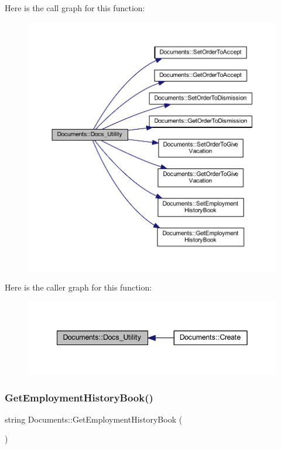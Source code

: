 Here is the call graph for this function\+:
\nopagebreak
\begin{figure}[H]
\begin{center}
\leavevmode
\includegraphics[width=350pt]{class_documents_a7f06bda36f9fe48a22a8c511aa1e2d06_cgraph}
\end{center}
\end{figure}
Here is the caller graph for this function\+:
\nopagebreak
\begin{figure}[H]
\begin{center}
\leavevmode
\includegraphics[width=342pt]{class_documents_a7f06bda36f9fe48a22a8c511aa1e2d06_icgraph}
\end{center}
\end{figure}
\mbox{\label{class_documents_a44b0e6798731de568258ff317c6700da}} 
\subsubsection{\texorpdfstring{Get\+Employment\+History\+Book()}{GetEmploymentHistoryBook()}}
{\footnotesize\ttfamily string Documents\+::\+Get\+Employment\+History\+Book (\begin{DoxyParamCaption}{ }\end{DoxyParamCaption})}



